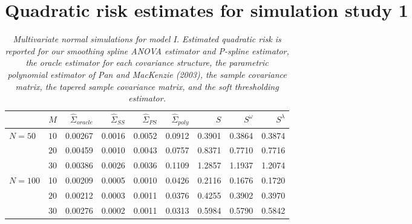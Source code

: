 \section{Quadratic risk estimates for simulation study 1}
%
\begin{table}[H]
\centering
\caption{\textit{Multivariate normal simulations for model I. Estimated quadratic risk is reported for our smoothing spline ANOVA estimator and P-spline estimator, the oracle estimator for each covariance structure, the parametric polynomial estimator of Pan and MacKenzie (2003), the sample covariance matrix, the tapered sample covariance matrix,
                                    and the soft thresholding estimator.}}
\begin{tabular}{lrrrrrrrr}
& $M$ &$\hat{\Sigma}_{oracle}$&  $\hat{\Sigma}_{SS}$& $\hat{\Sigma}_{PS}$ &$\hat{\Sigma}_{poly}$ & $S$ &$S^\omega$& $S^\lambda$ \\ 
  \hline
  $N = 50$ & $10$ &0.00267 & 0.0016 & 0.0052 &  0.0912 & 0.3901 & 0.3864 & 0.3874 \\ 
   		& $20$ &0.00459 & 0.0010 & 0.0043 &  0.0757 & 0.8371 & 0.7710 & 0.7716 \\ 
   		& $30$ & 0.00386 & 0.0026 & 0.0036 &  0.1109 & 1.2857 & 1.1937 & 1.2074 \\ 
 $N = 100$ & 10 &  0.00209 & 0.0005 & 0.0010 &0.0426 & 0.2116 & 0.1676 & 0.1720 \\ 
    		&   $20$ &  0.00212 &0.0003 & 0.0011 & 0.0376 & 0.4255 & 0.3902 & 0.3970 \\ 
    		&   $30$ &0.00276 & 0.0002 & 0.0011 &  0.0313 & 0.5984 & 0.5790 & 0.5842 \\ 
   \hline
\end{tabular} 
\label{table:simulation-1-quad-loss-sigma-1}
\end{table}
